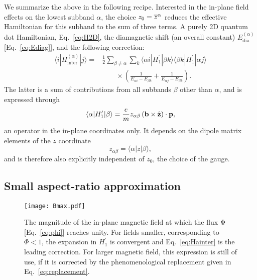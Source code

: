 \documentclass[aps,floatfix,twocolumn,showpacs,10pt,nofootinbib]{revtex4-1}
\newcommand{\be}{\begin{equation}}
\newcommand{\ee}{\end{equation}}
\begin{document}
We summarize the above in the following recipe. Interested in the in-plane field effects on the lowest subband $\alpha$, the choice $z_0 = \overline{z}^{\alpha}$ reduces the effective Hamiltonian for this subband to the sum of three terms. A purely 2D quantum dot Hamiltonian, Eq.~\eqref{eq:H2D}, the diamagnetic shift (an overall constant) $E_\textrm{dia}^{(\alpha)}$ [Eq.~\eqref{eq:Ediag}], and the following correction:
\be
\begin{split}
\langle i | H^{(\alpha)}_\textrm{inter} | j \rangle = & \frac{1}{2}
{\sum_{\beta \neq \alpha}}
{\sum_{k}}
 \langle \alpha i | H^\prime_1 |\beta k\rangle\langle \beta k | H^\prime_1 | \alpha j\rangle  \\
& \qquad
\times \left( \frac{1}{E_{\alpha i}-E_{\beta k}}
+ \frac{1}{E_{\alpha j}-E_{\beta k}} \right).
\end{split}
\label{eq:Lowdin2}
\ee
The latter is a sum of contributions from all subbands $\beta$ other than $\alpha$, and is expressed through
\be
\langle \alpha | H^\prime_1 | \beta \rangle = \frac{e}{m}
z_{\alpha\beta} \left( \Bin \times \z \right) \cdot \Pin,
\ee
an operator in the in-plane coordinates only. It depends on the dipole matrix elements of the $z$ coordinate
\be
z_{\alpha \beta}= \langle \alpha | z | \beta \rangle,
\ee
 and is therefore also explicitly independent of $z_0$, the choice of the gauge.

\subsection{Small aspect-ratio approximation}

\label{sec:smallaspect}

\begin{figure}
\texttt{[image: Bmax.pdf]}
\caption{\label{fig:Bmax}
The magnitude of the in-plane magnetic field at which the flux $\Phi$ [Eq.~\eqref{eq:phi}] reaches unity. For fields smaller, corresponding to $\Phi<1$, the expansion in $H_1^\prime$ is convergent and Eq.~\eqref{eq:Hainter} is the leading correction. For larger magnetic field, this expression is still of use, if it is corrected by the phenomenological replacement given in Eq.~\eqref{eq:replacement}.}
\end{figure}
\end{document}
